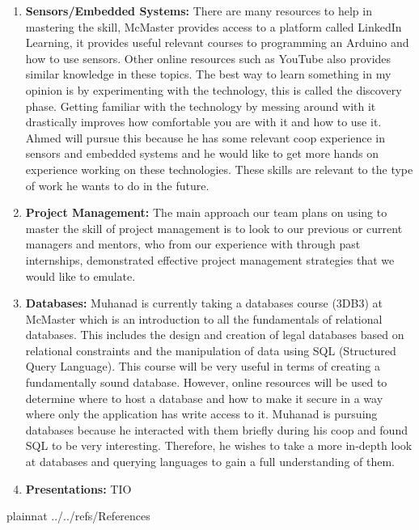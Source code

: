 \documentclass[12pt]{article}
\begin{document}
\begin{enumerate}
  \item \textbf{Sensors/Embedded Systems:} There are many resources to help in mastering the skill, McMaster provides access to a platform called LinkedIn Learning, it provides useful relevant courses to programming an Arduino and how to use sensors. Other online resources such as YouTube also provides similar knowledge in these topics. The best way to learn something in my opinion is by experimenting with the technology, this is called the discovery phase. Getting familiar with the technology by messing around with it drastically improves how comfortable you are with it and how to use it. Ahmed will pursue this because he has some relevant coop experience in sensors and embedded systems and he would like to get more hands on experience working on these technologies. These skills are relevant to the type of work he wants to do in the future.
  
  \item \textbf{Project Management:} The main approach our team plans on using to master the skill of project management is to look to our previous or current managers and mentors, who from our experience with through past internships, demonstrated effective project management strategies that we would like to emulate.  
  
  \item \textbf{Databases:} Muhanad is currently taking a databases course (3DB3) at McMaster which is an introduction to all the fundamentals of relational databases. This includes the design and creation of legal databases based on relational constraints and the manipulation of data using SQL (Structured Query Language). This course will be very useful in terms of creating a fundamentally sound database. However, online resources will be used to determine where to host a database and how to make it secure in a way where only the application has write access to it. Muhanad is pursuing databases because he interacted with them briefly during his coop and found SQL to be very interesting. Therefore, he wishes to take a more in-depth look at databases and querying languages to gain a full understanding of them.
  
  \item \textbf{Presentations:} TIO
  
\end{enumerate}

\newpage

 {plainnat}
 {../../refs/References}
\end{document}
